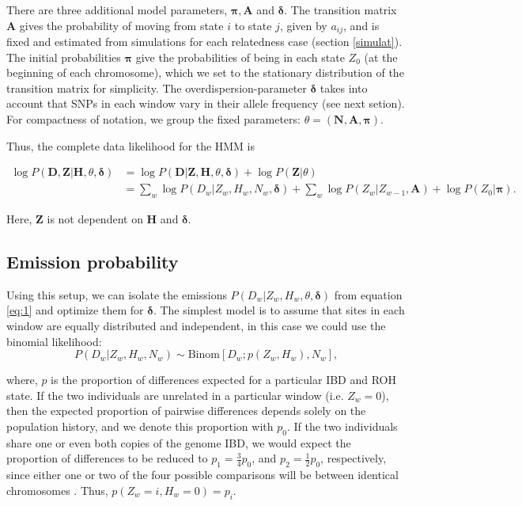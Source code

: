 \documentclass[12pt, letterpaper]{article}
\newcommand{\BZ}{\mathbf{Z}}
\newcommand{\BD}{\mathbf{D}}
\newcommand{\BN}{\mathbf{N}}
\newcommand{\BH}{\mathbf{H}}
\begin{document}
There are three additional model parameters, $\bm{\pi}, \mathbf{A}$ and $\bm{\delta}$. The transition matrix $\mathbf{A}$ gives the probability of moving from state $i$ to state $j$, given by $a_{ij}$, and is fixed and estimated from simulations for each relatedness case (section \ref{simulat}). The initial probabilities $\bm{\pi}$ give the probabilities of being in each state $Z_0$ (at the beginning of each chromosome), which we set to the stationary distribution of the transition matrix for simplicity. The overdispersion-parameter $\bm{\delta}$ takes into account that SNPs in each window vary in their allele frequency (see next setion).  For compactness of notation, we group the fixed parameters: $\theta = (\BN, \mathbf{A}, \bm{\pi})$.

Thus, the complete data likelihood for the HMM is

\begin{align}\label{eq:1}
\log P(\BD,\BZ|\BH, \theta, \bm{\delta}) &= \log P(\BD|\BZ,\BH, \theta, \bm{\delta}) + \log P(\BZ |\theta) \nonumber\\
&= \sum_w \log P(D_w|Z_w,H_w, N_w, \bm{\delta}) + \sum_w \log P(Z_w |Z_{w-1},\bm{A}) + \log P(Z_0|\bm{\pi})\text{.}
\end{align}

Here, $\BZ$ is not dependent on $\BH$ and $\bm{\delta}$.

\subsection{Emission probability}\label{B}

Using this setup, we can isolate the emissions $P(D_w | Z_w, H_w ,\theta, \bm{\delta})$ from equation \ref{eq:1} and optimize them for $\bm{\delta}$. The simplest model is to assume that sites in each window are equally distributed and independent, in this case we could use the  binomial likelihood:
$$P(D_w|Z_w, H_w, N_w) \sim \text{Binom}[D_w ; p(Z_w, H_w), N_w] \text{,}$$

where, $p$ is the proportion of differences expected for a particular IBD and ROH state. If the two individuals are unrelated in a particular window (i.e. $Z_w = 0$), then the expected proportion of pairwise differences depends solely on the population history, and we denote this proportion with $p_0$. If the two individuals share one or even both copies of the genome IBD, we would expect the proportion of differences to be reduced to $p_1 = \frac{3}{4} p_0$, and $p_2 = \frac{1}2 p_0$, respectively, since either one or two of the four possible comparisons will be between identical chromosomes \cite{kuhn_estimating_2018}. Thus, $p(Z_w=i, H_w=0) = p_i$.
\end{document}
